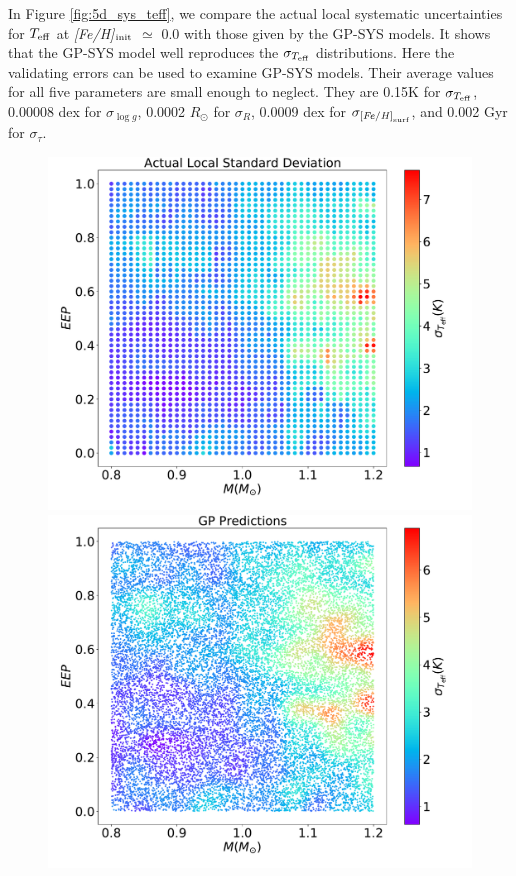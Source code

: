 In Figure \ref{fig:5d_sys_teff}, we compare the actual local systematic uncertainties for $T_{\rm eff}$ at {\it [Fe/H]}$_{\rm init}$ $\simeq$ 0.0 with those given by the GP-SYS models. It shows that the GP-SYS model well reproduces the $\sigma_{T_{\rm eff}}$ distributions. 
%
Here the validating errors can be used to examine GP-SYS models. Their average values for all five parameters are small enough to neglect. They are  0.15K for $\sigma_{T_{\rm eff}}$, 0.00008 dex for $\sigma_{\log g}$, 0.0002 $R_{\odot}$ for $\sigma_{R}$, 0.0009 dex for $\sigma_{\rm {\it [Fe/H]}_{\rm surf}}$, and 0.002 Gyr for $\sigma_{\tau}$. 

\begin{figure}
	\includegraphics[width=1.0\columnwidth]{5d_sys_teff.pdf}
	\includegraphics[width=1.0\columnwidth]{5d_sys_effective_T_std_predictions.pdf}

\end{figure}
